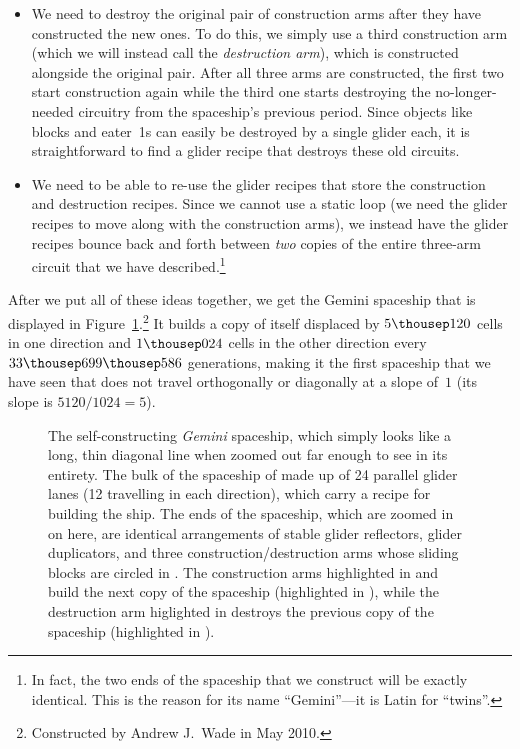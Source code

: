 \begin{itemize}
	\item We need to destroy the original pair of construction arms after they have constructed the new ones. To do this, we simply use a third construction arm (which we will instead call the \emph{destruction arm}), which is constructed alongside the original pair. After all three arms are constructed, the first two start construction again while the third one starts destroying the no-longer-needed circuitry from the spaceship's previous period. Since objects like blocks and eater~1s can easily be destroyed by a single glider each, it is straightforward to find a glider recipe that destroys these old circuits.\smallskip
	
	\item We need to be able to re-use the glider recipes that store the construction and destruction recipes. Since we cannot use a static loop (we need the glider recipes to move along with the construction arms), we instead have the glider recipes bounce back and forth between \emph{two} copies of the entire three-arm circuit that we have described.\footnote{In fact, the two ends of the spaceship that we construct will be exactly identical. This is the reason for its name ``Gemini''---it is Latin for ``twins''.}\smallskip
\end{itemize}

After we put all of these ideas together, we get the Gemini spaceship that is displayed in Figure~\ref{fig:gemini}.\footnote{Constructed by Andrew J.~Wade in May 2010.} It builds a copy of itself displaced by $5{\thousep}120$ cells in one direction and $1{\thousep}024$ cells in the other direction every $33{\thousep}699{\thousep}586$ generations, making it the first spaceship that we have seen that does not travel orthogonally or diagonally at a slope of~$1$ (its slope is $5120/1024 = 5$).

\begin{figure}[!htb]
	\centering
	\caption{The self-constructing \emph{Gemini} spaceship, which simply looks like a long, thin diagonal line when zoomed out far enough to see in its entirety. The bulk of the spaceship of made up of 24 parallel glider lanes (12 travelling in each direction), which carry a recipe for building the ship. The ends of the spaceship, which are zoomed in on here, are identical arrangements of stable glider reflectors, glider duplicators, and three construction/destruction arms whose sliding blocks are circled in . The construction arms highlighted in  and  build the next copy of the spaceship (highlighted in ), while the destruction arm higlighted in  destroys the previous copy of the spaceship (highlighted in ).}\label{fig:gemini}
\end{figure}


